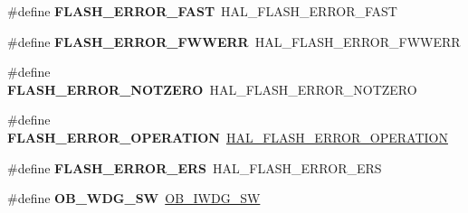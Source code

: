 \begin{DoxyCompactItemize}
\item 
\mbox{\label{group___h_a_l___f_l_a_s_h___aliased___defines_gad20c28b002e14116facba21f02b0d1ba}} 
\#define {\bfseries F\+L\+A\+S\+H\+\_\+\+E\+R\+R\+O\+R\+\_\+\+F\+A\+ST}~H\+A\+L\+\_\+\+F\+L\+A\+S\+H\+\_\+\+E\+R\+R\+O\+R\+\_\+\+F\+A\+ST
\item 
\mbox{\label{group___h_a_l___f_l_a_s_h___aliased___defines_ga9386eae0fe9e5b47720ad2378d27e743}} 
\#define {\bfseries F\+L\+A\+S\+H\+\_\+\+E\+R\+R\+O\+R\+\_\+\+F\+W\+W\+E\+RR}~H\+A\+L\+\_\+\+F\+L\+A\+S\+H\+\_\+\+E\+R\+R\+O\+R\+\_\+\+F\+W\+W\+E\+RR
\item 
\mbox{\label{group___h_a_l___f_l_a_s_h___aliased___defines_ga987edd2bf3a39310a655473718d9b495}} 
\#define {\bfseries F\+L\+A\+S\+H\+\_\+\+E\+R\+R\+O\+R\+\_\+\+N\+O\+T\+Z\+E\+RO}~H\+A\+L\+\_\+\+F\+L\+A\+S\+H\+\_\+\+E\+R\+R\+O\+R\+\_\+\+N\+O\+T\+Z\+E\+RO
\item 
\mbox{\label{group___h_a_l___f_l_a_s_h___aliased___defines_gaae29e90680573edfa4e11e07b2557f16}} 
\#define {\bfseries F\+L\+A\+S\+H\+\_\+\+E\+R\+R\+O\+R\+\_\+\+O\+P\+E\+R\+A\+T\+I\+ON}~\hyperlink{group___f_l_a_s_h___error___code_gafa1433e0ca2366478928c04244310d44}{H\+A\+L\+\_\+\+F\+L\+A\+S\+H\+\_\+\+E\+R\+R\+O\+R\+\_\+\+O\+P\+E\+R\+A\+T\+I\+ON}
\item 
\mbox{\label{group___h_a_l___f_l_a_s_h___aliased___defines_gaf908de74b3e013ed30976d9e645354e2}} 
\#define {\bfseries F\+L\+A\+S\+H\+\_\+\+E\+R\+R\+O\+R\+\_\+\+E\+RS}~H\+A\+L\+\_\+\+F\+L\+A\+S\+H\+\_\+\+E\+R\+R\+O\+R\+\_\+\+E\+RS
\item 
\mbox{\label{group___h_a_l___f_l_a_s_h___aliased___defines_gac332a5aa5da146e19f3c39067220f0f8}} 
\#define {\bfseries O\+B\+\_\+\+W\+D\+G\+\_\+\+SW}~\hyperlink{group___f_l_a_s_h_ex___option___bytes___i_watchdog_ga5a357e232c955444c3f2ccb9a937ffce}{O\+B\+\_\+\+I\+W\+D\+G\+\_\+\+SW}
\item 
\mbox{\label{group___h_a_l___f_l_a_s_h___aliased___defines_gae9a94b5f21aaa5dd5558095fa684b5a3}} 

\end{DoxyCompactItemize}
